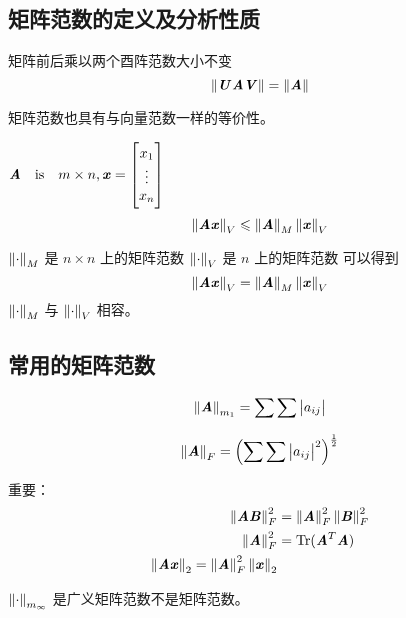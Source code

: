 \subsection{矩阵范数的定义及分析性质}
\label{sub:矩阵范数的定义及分析性质}

\begin{definition}[(广义)矩阵范数是酉不变的]
    矩阵前后乘以两个酉阵范数大小不变
    \[
        \norm{\MU \MA \MV} = \norm{\MA}
    \]
\end{definition}

\begin{theorem}
    矩阵范数也具有与向量范数一样的等价性。
\end{theorem}

\begin{definition}[矩阵范数与向量范数相容]
    $\amn, \vxx$
    \[
        \norm{\MA \Vx}_{V} \leqslant \norm{\MA}_M \norm{\Vx}_V
    \]
\end{definition}

\begin{theorem}
    $\norm{\cdot}_M$ 是 $n \times n$ 上的矩阵范数
    $\norm{\cdot}_V$ 是 $n$ 上的矩阵范数
    可以得到
    \[
        \norm{\MA \Vx}_V = \norm{\MA}_M \norm{\Vx}_V
    \]
    $\norm{\cdot}_M$ 与 $\norm{\cdot}_V$ 相容。
\end{theorem}

\subsection{常用的矩阵范数}
\label{sub:常用的矩阵范数}

\begin{definition}[$l_1$范数]
    \[
        \norm{\MA}_{m_1} = \sum \sum \abs{a_{ij}}
    \]
\end{definition}

\begin{definition}
    \[
        \norm{\MA}_F =
        \left ( \sum \sum \abs{a_{ij}}^2 \right)^{\frac{1}{2}}
    \]
\end{definition}

重要：
\[
    \begin{aligned}
        \norm{\MA \MB}_F^2 &= \norm{\MA}_F^2 \norm{\MB}_F^2 \\
        \norm{\MA}_F^2 &= \Tr(\MA^T\MA) \\
        \norm{\MA \Vx}_2 = \norm{\MA}_F^2 \norm{\Vx}_2
    \end{aligned}
\]

$\norm{\cdot}_{m_{\infty}}$ 是广义矩阵范数不是矩阵范数。

